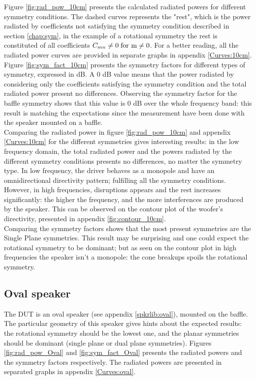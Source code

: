 \documentclass{report}
\begin{document}
Figure \ref{fig:rad_pow_10cm} presents the calculated radiated powers for different symmetry conditions. The dashed curves represents the "rest", which is the power radiated by coefficients not satisfying the symmetry condition described in section \ref{chap:sym}, in the example of a rotational symmetry the rest is constituted of all coefficients $C_{mn} \neq 0 \;  \textup{for m}  \neq 0$. For a better reading, all the radiated power curves are provided in separate graphs in appendix \ref{Curves:10cm}.\\

Figure \ref{fig:sym_fact_10cm} presents the symmetry factors for different types of symmetry, expressed in dB. A 0 dB value means that the power radiated by considering only the coefficients satisfying the symmetry condition and the total radiated power present no differences. Observing the symmetry factor for the baffle symmetry shows that this value is 0 dB over the whole frequency band: this result is matching the expectations since the measurement have been done with the speaker mounted on a baffle. \\

Comparing the radiated power in figure \ref{fig:rad_pow_10cm} and appendix \ref{Curves:10cm} for the different symmetries gives interesting results: in the low frequency domain, the total radiated power and the powers radiated by the different symmetry conditions presents no differences, no matter the symmetry type. In low frequency, the driver behaves as a monopole and have an omnidirectional directivity pattern; fulfilling all the symmetry conditions. \\
However, in high frequencies, disruptions appears and the rest increases significantly: the higher the frequency, and the more interferences are produced by the speaker. This can be observed on the contour plot of the woofer's directivity, presented in appendix \ref{fig:contour_10cm}. \\

Comparing the symmetry factors shows that the most present symmetries are the Single Plane symmetries. This result may be surprising and one could expect the rotational symmetry to be dominant; but as seen on the contour plot in high frequencies the speaker isn't a monopole: the cone breakups spoils the rotational symmetry. 

\newpage

\subsection{Oval speaker}
The DUT is an oval speaker (see appendix \ref{spkrlib:oval}), mounted on the baffle. The particular geometry of this speaker gives hints about the expected results: the rotational symmetry should be the lowest one, and the planar symmetries should be dominant (single plane or dual plane symmetries).  Figures \ref{fig:rad_pow_Oval} and \ref{fig:sym_fact_Oval} presents the radiated powers and the symmetry factors respectively. The radiated powers are presented in separated graphs in appendix \ref{Curves:oval}.\\
\end{document}
